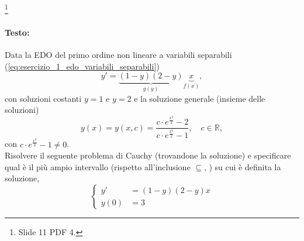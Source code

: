 \begin{example}\footnote{Slide 11 PDF 4.}
    \paragraph{Testo:} Data la EDO del primo ordine non lineare a variabili separabili (\ref{eq:esercizio_1_edo_variabili_separabili})
    \begin{equation*}
        y' = \underbrace{(1-y)(2-y)}_{g(y)}\underbrace{x}_{f(x)},
    \end{equation*}
    con soluzioni costanti $y=1$ e $y=2$ e la soluzione generale (insieme delle soluzioni)
    \begin{equation}\label{eq:esercizio_1_intergrale_generale_problema_cauchy}
        y(x) = y(x,c)=\frac{c\cdot e^{\frac{x^2}{2}}-2}{c\cdot e^{\frac{x^2}{2}}-1},\quad c\in\mathbb R,
    \end{equation}
    con $c\cdot e^{\frac{x^2}{2}}-1\neq 0$.\\
    Risolvere il seguente problema di Cauchy (trovandone la soluzione) e specificare qual è il più ampio intervallo (rispetto all'inclusione $\subseteq$, \footnotemark) su cui è definita la soluzione,
    \begin{equation}
        \begin{cases}
            y'&=(1-y)(2-y)x\\
            y(0) &= 3
        \end{cases}
    \end{equation}
    

\end{example}
